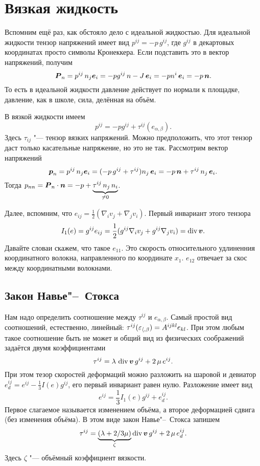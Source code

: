 \section{Вязкая жидкость}
Вспомним ещё раз, как обстояло дело с идеальной жидкостью. Для идеальной жидкости тензор напряжений имеет вид $p^{ij} = -p\,g^{ij}$, где $g^{ij}$ в декартовых координатах просто символы Кронеккера. Если подставить это в вектор напряжений, получим
\[
 \boldsymbol{P}_n = p^{ij}\,n_j\boldsymbol{e}_i = -p g^{ij}\, n-J\,\boldsymbol{e}_i = -p n^i\,\boldsymbol{e}_i = -p\,\boldsymbol{n}.
\]
То есть в идеальной жидкости давление действует по нормали к площадке, давление, как в школе, сила, делённая на объём.

В вязкой жидкости имеем
\[
  p^{ij} = -p g^{ij} + \tau^{ij}(e_{\alpha,\beta}).
\]
Здесь $\tau_{ij}$ "--- тензор вязких напряжений. Можно предположить, что этот тензор даст только касательные напряжение, но это не так. Рассмотрим вектор напряжений
\[
  \boldsymbol{p}_n = p^{ij}\,n_j\boldsymbol{e}_i = (-p\,g^{ij}+\tau^{ij})n_j\,\boldsymbol{e}_i = 
  -p\,\boldsymbol{n} + \tau^{ij}\,n_j\,\boldsymbol{e}_i.
\]
Тогда $p_{nn} = \boldsymbol{P}_n\cdot \boldsymbol{n} = -p+\underbrace{\tau^{ij}\,n_j\,n_i}_{\ne0}$.

Далее, вспомним, что $e_{ij} = \frac12(\nabla_i v_j+\nabla_j v_i)$. Первый инвариант этого тензора
\[
  I_1(e) = g^{ij}e_{ij} = \frac12(g^{ij}\nabla_i v_j + g^{ij}\nabla_j v_i) = 
  \operatorname{div}\boldsymbol{v}.
\]
Давайте словаи скажем, что такое $e_{11}$. Это скорость относительного удлиненния координатного волокна, направленного по координате $x_1$. $e_{12}$ отвечает за скос между координатными волокнами.

\subsection{Закон Навье"--~Стокса}
Нам надо определить соотношение между $\tau^{ij}$ и $e_{\alpha,\beta}$. Самый простой вид соотношений, естественно, линейный: $\tau^{ij}(\varepsilon_{\langle,\beta}) = A^{ijkl}e_{kl}$. При этом любым такое соотношение быть не может и общий вид из физических соображений задаётся двумя коэффициентами
\[
  \tau^{ij} = \lambda\,\operatorname{div}\boldsymbol{v}\,g^{ij} +2\,\mu\,e^{ij}.
\]
При этом тезор скоростей деформаций можно разложить на шаровой и девиатор $e^{ij}_d = e^{ij}-\frac13 I(e)g^{ij}$, его первый инвариант равен нулю. Разложение имеет вид
\[
  e^{ij} = \frac13 I_1(e) g^{ij} + e^{ij}_d.
\]
Первое слагаемое называется изменением объёма, а второе деформацией сдвига (без изменения объёма). В этом виде закон Навье"--~Стокса запишем
\[
 \tau^{ij} = \underbrace{(\lambda+2/3\mu)}_\zeta\operatorname{div}\boldsymbol{v}\,g^{ij} + 2\,\mu\,e^{ij}_d.
\]
Здесь $\zeta$ "--- объёмный коэффициент вязкости.

